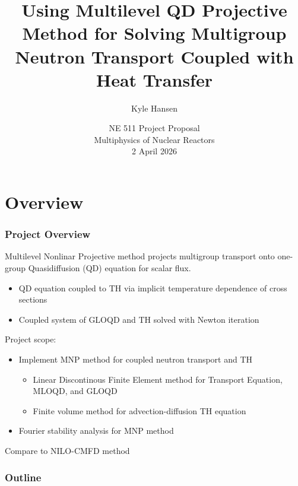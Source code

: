 \documentclass{beamer}
\title[QD Multiphysics Coupling]{Using Multilevel QD Projective Method for Solving Multigroup Neutron Transport Coupled with Heat Transfer}
\author[K. Hansen]{Kyle Hansen}
\institute[NCSU]{North Carolina State University}
\date[April 2026]{NE 511 Project Proposal\\Multiphysics of Nuclear Reactors\\2 April 2026}
\begin{document}
\frame{\titlepage}

\section{Overview}

\begin{frame}
    \frametitle{Project Overview}
    Multilevel Nonlinar Projective method projects multigroup transport onto one-group Quasidiffusion (QD) equation for scalar flux.
    \begin{itemize}
        \item QD equation coupled to TH via implicit temperature dependence of cross sections
        \item Coupled system of GLOQD and TH solved with Newton iteration
    \end{itemize}
    Project scope:
    \begin{itemize}
        \item Implement MNP method for coupled neutron transport and TH
        \begin{itemize}
            \item Linear Discontinous Finite Element method for Transport Equation, MLOQD, and GLOQD
            \item Finite volume method for advection-diffusion TH equation
        \end{itemize}
        \item Fourier stability analysis for MNP method
    \end{itemize}
    Compare to NILO-CMFD method
\end{frame}

\begin{frame}
    \frametitle{Outline}
    \tableofcontents
\end{frame}
\end{document}

